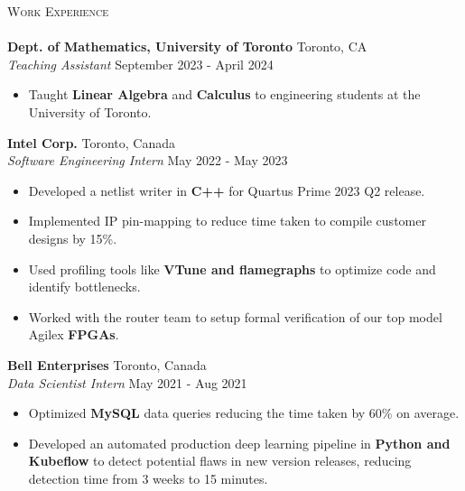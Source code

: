 \documentclass[a4paper]{article}
\newcommand{\lineunder} {
    \vspace*{-8pt} \\
    \hspace*{-18pt} \hrulefill \\
}
\newcommand{\header} [1] {
    {\hspace*{-18pt}\vspace*{6pt} \textsc{#1}}
    \vspace*{-6pt} \lineunder
}
\begin{document}
\header{Work Experience}

\textbf{Dept. of Mathematics, University of Toronto} \hfill Toronto, CA\\
\textit{Teaching Assistant} \hfill September 2023 - April 2024\\
\vspace{-2.5mm}
\begin{itemize} \itemsep 0.5pt
	\item Taught \textbf{Linear Algebra} and \textbf{Calculus} to engineering students at the University of Toronto.
    \vspace{-2mm}
\end{itemize}

\vspace{1mm}

\textbf{Intel Corp.} \hfill Toronto, Canada\\
\textit{Software Engineering Intern} \hfill May 2022 - May 2023\\
\vspace{-2.5mm}
\begin{itemize} \itemsep 1pt
	\item Developed a netlist writer in \textbf{C++} for Quartus Prime 2023 Q2 release.
	\vspace{-1.5mm}
	\item Implemented IP pin-mapping to reduce time taken to compile customer designs by 15\%.
	\vspace{-1.5mm}
	\item Used profiling tools like \textbf{VTune and flamegraphs} to optimize code and identify bottlenecks. 
	\vspace{-1.5mm}
    \item Worked with the router team to setup formal verification of our top model Agilex \textbf{FPGAs}. 
    \vspace{-1.5mm}
\end{itemize}

\textbf{Bell Enterprises} \hfill Toronto, Canada\\
\textit{Data Scientist Intern} \hfill May 2021 - Aug 2021\\
\vspace{-2.5mm}
\begin{itemize} \itemsep 1pt
	\item Optimized \textbf{MySQL} data queries reducing the time taken by 60\% on average.
	\vspace{-1.5mm}
	\item Developed an automated production deep learning pipeline in \textbf{Python and Kubeflow} to detect potential flaws in new version releases, reducing detection time from 3 weeks to 15 minutes.
    \vspace{-1.5mm}
\end{itemize}
\end{document}
